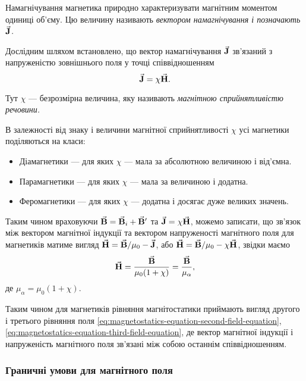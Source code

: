 \begin{definition}
	Намагнічування магнетика природно характеризувати магнітним моментом одиниці об'єму. Цю величину називають \it{вектором намагнічування} і позначають ${\vec{\mathbf{J}}}$.
\end{definition}

Дослідним шляхом встановлено, що вектор намагнічування ${\vec{\mathbf{J}}}$ зв'язаний з напруженістю зовнішнього поля у точці співвідношенням
\begin{equation}
	{\vec{\mathbf{J}}} = \chi {\vec{\mathbf{H}}}.
\end{equation}

\begin{definition}
    Тут $\chi$ --- безрозмірна величина, яку називають \it{магнітною сприйнятливістю речовини}.
\end{definition}

В залежності від знаку і величини магнітної сприйнятливості $\chi$ усі магнетики поділяються на класи:
\begin{itemize}
	\item Діамагнетики --- для яких $\chi$ --- мала за абсолютною величиною і від'ємна.
	\item Парамагнетики --- для яких $\chi$ --- мала за величиною і додатна.
	\item Феромагнетики --- для яких $\chi$ --- додатна і досягає дуже великих значень.
\end{itemize}

Таким чином враховуючи ${\vec{\mathbf{B}}} = {\vec{\mathbf{B}}}_i + {\vec{\mathbf{B}}}'$ та ${\vec{\mathbf{J}}} = \chi {\vec{\mathbf{H}}}$, можемо записати, що зв'язок між вектором магнітної індукції та вектором напруженості магнітного поля для магнетиків матиме вигляд ${\vec{\mathbf{H}}} = {\vec{\mathbf{B}}} / \mu_0 - {\vec{\mathbf{J}}}$, або ${\vec{\mathbf{H}}} = {\vec{\mathbf{B}}} / \mu_0 - \chi {\vec{\mathbf{H}}}$, звідки маємо 
\begin{equation}
	{\vec{\mathbf{H}}} = \frac{{\vec{\mathbf{B}}}}{\mu_0 (1 + \chi)} = \frac{{\vec{\mathbf{B}}}}{\mu_\alpha},
\end{equation}
де $\mu_\alpha = \mu_0 (1 + \chi)$. \medskip

Таким чином для магнетиків рівняння магнітостатики приймають вигляд другого і третього рівняння поля \eqref{eq:magnetostatics-equation-second-field-equation}, \eqref{eq:magnetostatics-equation-third-field-equation}, де вектор магнітної індукції і напруженість магнітного поля зв'язані між собою останнім співвідношенням.

\subsubsection{Граничні умови для магнітного поля}

